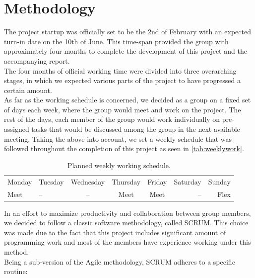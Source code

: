 
\chapter{Methodology} %

\label{ch:theory} %


The project startup was officially set to be the 2nd of February with an expected turn-in date on the 10th of June. This time-span provided the group with approximately four months to complete the development of this project and the accompanying report.\\
The four months of official working time were divided into three overarching stages, in which we expected various parts of the project to have progressed a certain amount.\\

As far as the working schedule is concerned, we decided as a group on a fixed set of days each week, where the group would meet and work on the project. The rest of the days, each member of the group would work individually on pre-assigned tasks that would be discussed among the group in the next available meeting. Taking the above into account, we set a weekly schedule that was followed throughout the completion of this project as seen in \autoref{tab:weeklywork}.\\

\begin{table}
\centering
\begin{tabular}{ l | l | c | c | c | r | r }
Monday & Tuesday & Wednesday & Thursday & Friday & Saturday & Sunday \\
Meet & -- & -- & Meet & Meet & -- & Flex

\end{tabular} 
\caption{Planned weekly working schedule.}
\label{tab:weeklywork}
\end{table}

In an effort to maximize productivity and collaboration between group members, we decided to follow a classic software methodology, called SCRUM. This choice was made due to the fact that this project includes significant amount of programming work and most of the members have experience working under this method. \\
Being a sub-version of the Agile methodology, SCRUM adheres to a specific routine:

